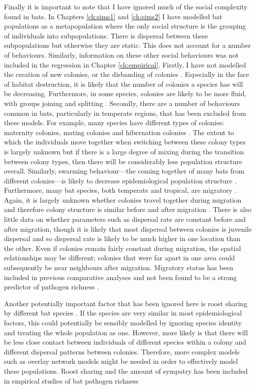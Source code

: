 Finally it is important to note that I have ignored much of the social complexity found in bats.
In Chapters \ref{ch:sims1} and \ref{ch:sims2} I have modelled bat populations as a metapopulation where the only social structure is the grouping of individuals into subpopulations.
There is dispersal between these subpopulations but otherwise they are static.
This does not account for a number of behaviours.
Similarly, information on these other social behaviours was not included in the regression in Chapter \ref{ch:empirical}.
Firstly, I have not modelled the creation of new colonies, or the disbanding of colonies \cite{metheny2008genetic}.
Especially in the face of habitat destruction, it is likely that the number of colonies a species has will be decreasing.
Furthermore, in some species, colonies are likely to be more fluid, with groups joining and splitting \cite{kerth2012causes}.
Secondly, there are a number of behaviours common in bats, particularly in temperate regions, that has been excluded from these models.
For example, many species have different types of colonies: maternity colonies, mating colonies and hibernation colonies \cite{kerth2008causes}.
The extent to which the individuals move together when switching between these colony types is largely unknown \cite{} but if there is a large degree of mixing during the transition between colony types, then there will be considerably less population structure overall.
Similarly, swarming behaviour---the coming together of many bats from different colonies---is likely to decrease epidemiological population structure \cite{kerth2012causes}.
Furthermore, many bat species, both temperate and tropical, are migratory \cite{fleming2003ecology, krauel2013recent, popa2009bats}.
Again, it is largely unknown whether colonies travel together during migration and therefore colony structure is similar before and after migration \cite{}.
There is also little data on whether parameters such as dispersal rate are constant before and after migration, though it is likely that most dispersal between colonies is juvenile dispersal and so dispersal rate is likely to be much higher in one location than the other.
Even if colonies remain fairly constant during migration, the spatial relationships may be different; colonies that were far apart in one area could subsequently be near neighbours after migration.
Migratory status has been included in previous comparative analyses and not been found to be a strong predictor of pathogen richness \cite{}. 

Another potentially important factor that has been ignored here is roost sharing by different bat species \cite{}.
If the species are very similar in most epidemiological factors, this could potentially be sensibly modelled by ignoring species identity and treating the whole population as one.
However, more likely is that there will be less close contact between individuals of different species within a colony and different dispersal patterns between colonies.
Therefore, more complex models such as overlay network models might be needed in order to effectively model these populations.
Roost sharing and the amount of sympatry has been included in empirical studies of bat pathogen richness \cite{} %

